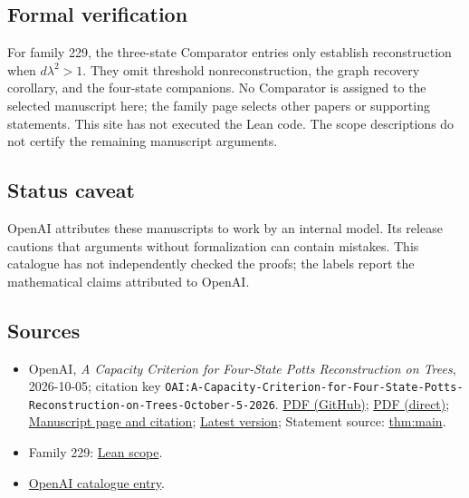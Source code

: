 \documentclass[11pt]{article}
\begin{document}
\subsection{Formal verification}
For family 229, the three-state Comparator entries only establish reconstruction when $d\lambda^2>1$. They omit threshold nonreconstruction, the graph recovery corollary, and the four-state companions. No Comparator is assigned to the selected manuscript here; the family page selects other papers or supporting statements. This site has not executed the Lean code. The scope descriptions do not certify the remaining manuscript arguments.

\subsection{Status caveat}
OpenAI attributes these manuscripts to work by an internal model. Its release cautions that arguments without formalization can contain mistakes. This catalogue has not independently checked the proofs; the labels report the mathematical claims attributed to OpenAI.

\subsection{Sources}
\begin{itemize}
\item OpenAI, \emph{A Capacity Criterion for Four-State Potts Reconstruction on Trees}, 2026-10-05; citation key \texttt{OAI:A-Capacity-Criterion-for-Four-State-Potts-Reconstruction-on-Trees-October-5-2026}. \href{https://github.com/openai/math/blob/adc7f1241b42e322a6451854ab7e4b4c146bf78a/preprints/A-Capacity-Criterion-for-Four-State-Potts-Reconstruction-on-Trees-October-5-2026/four-state-capacity.pdf}{PDF (GitHub)}; \href{https://github.com/openai/math/raw/adc7f1241b42e322a6451854ab7e4b4c146bf78a/preprints/A-Capacity-Criterion-for-Four-State-Potts-Reconstruction-on-Trees-October-5-2026/four-state-capacity.pdf}{PDF (direct)}; \href{https://github.com/openai/math/blob/adc7f1241b42e322a6451854ab7e4b4c146bf78a/preprints/A-Capacity-Criterion-for-Four-State-Potts-Reconstruction-on-Trees-October-5-2026/README.md}{Manuscript page and citation}; \href{https://github.com/openai/math/blob/main/preprints/A-Capacity-Criterion-for-Four-State-Potts-Reconstruction-on-Trees-October-5-2026/four-state-capacity.pdf}{Latest version}; Statement source: \href{https://github.com/openai/math/blob/adc7f1241b42e322a6451854ab7e4b4c146bf78a/preprints/A-Capacity-Criterion-for-Four-State-Potts-Reconstruction-on-Trees-October-5-2026/build/main.tex\#L95}{thm:main}.
\item Family 229: \href{https://github.com/openai/math/blob/adc7f1241b42e322a6451854ab7e4b4c146bf78a/lean/docs/229.md}{Lean scope}.
\item \href{https://github.com/openai/math/blob/adc7f1241b42e322a6451854ab7e4b4c146bf78a/CONTENTS.md}{OpenAI catalogue entry}.
\end{itemize}
\end{document}
